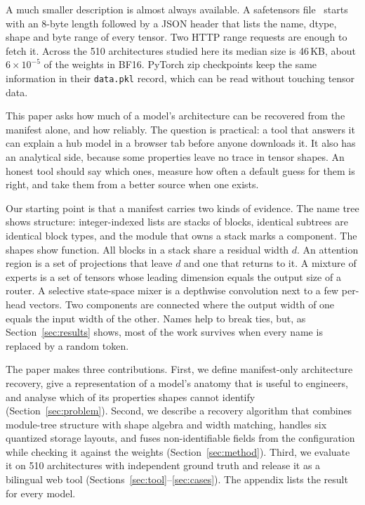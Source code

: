 \documentclass[11pt]{article}
\newcommand{\tn}[1]{\texttt{#1}}
\begin{document}
A much smaller description is almost always available. A safetensors file~\citep{safetensors} starts with an 8-byte length followed by a JSON header that lists the name, dtype, shape and byte range of every tensor. Two HTTP range requests are enough to fetch it. Across the 510 architectures studied here its median size is 46\,KB, about $6\times10^{-5}$ of the weights in BF16. PyTorch zip checkpoints keep the same information in their \tn{data.pkl} record, which can be read without touching tensor data.

This paper asks how much of a model's architecture can be recovered from the manifest alone, and how reliably. The question is practical: a tool that answers it can explain a hub model in a browser tab before anyone downloads it. It also has an analytical side, because some properties leave no trace in tensor shapes. An honest tool should say which ones, measure how often a default guess for them is right, and take them from a better source when one exists.

Our starting point is that a manifest carries two kinds of evidence. The name tree shows structure: integer-indexed lists are stacks of blocks, identical subtrees are identical block types, and the module that owns a stack marks a component. The shapes show function. All blocks in a stack share a residual width $d$. An attention region is a set of projections that leave $d$ and one that returns to it. A mixture of experts is a set of tensors whose leading dimension equals the output size of a router. A selective state-space mixer is a depthwise convolution next to a few per-head vectors. Two components are connected where the output width of one equals the input width of the other. Names help to break ties, but, as Section~\ref{sec:results} shows, most of the work survives when every name is replaced by a random token.

The paper makes three contributions. First, we define manifest-only architecture recovery, give a representation of a model's anatomy that is useful to engineers, and analyse which of its properties shapes cannot identify (Section~\ref{sec:problem}). Second, we describe a recovery algorithm that combines module-tree structure with shape algebra and width matching, handles six quantized storage layouts, and fuses non-identifiable fields from the configuration while checking it against the weights (Section~\ref{sec:method}). Third, we evaluate it on 510 architectures with independent ground truth\RBintro{} and release it as a bilingual web tool (Sections~\ref{sec:tool}--\ref{sec:cases}). The appendix lists the result for every model.
\end{document}
